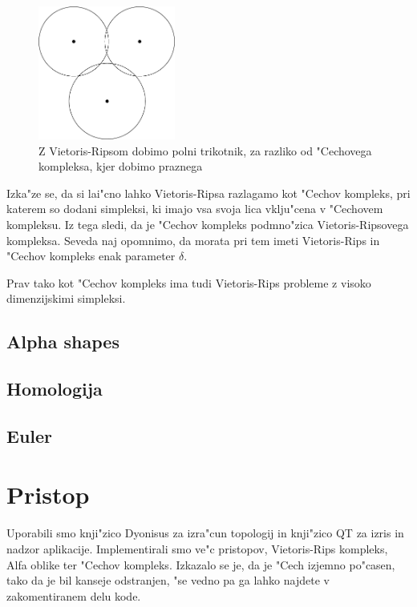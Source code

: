 \documentclass[11pt]{article}
\begin{document}
\begin{figure}[!htb]
    \centering
    \includegraphics[width=0.4\textwidth]{vrdiag.png}
    \caption{Z Vietoris-Ripsom dobimo polni trikotnik, za razliko od "Cechovega kompleksa, kjer dobimo praznega}
    \label{fig:vrdiag}
\end{figure}

Izka"ze se, da si lai"cno lahko Vietoris-Ripsa razlagamo kot "Cechov kompleks, pri katerem so dodani simpleksi, ki imajo vsa svoja lica vklju"cena v "Cechovem kompleksu. Iz tega sledi, da je "Cechov kompleks podmno"zica Vietoris-Ripsovega kompleksa. Seveda naj opomnimo, da morata pri tem imeti Vietoris-Rips in "Cechov kompleks enak parameter $\delta$. 

Prav tako kot "Cechov kompleks ima tudi Vietoris-Rips probleme z visoko dimenzijskimi simpleksi.

\subsection{Alpha shapes}

\subsection{Homologija}

\subsection{Euler}

\section{Pristop}

Uporabili smo knji"zico Dyonisus za izra"cun topologij in knji"zico QT za izris in nadzor aplikacije. Implementirali smo ve"c pristopov, Vietoris-Rips kompleks, Alfa oblike ter "Cechov kompleks. Izkazalo se je, da je "Cech izjemno po"casen, tako da je bil kanseje odstranjen, "se vedno pa ga lahko najdete v zakomentiranem delu kode.
\end{document}
